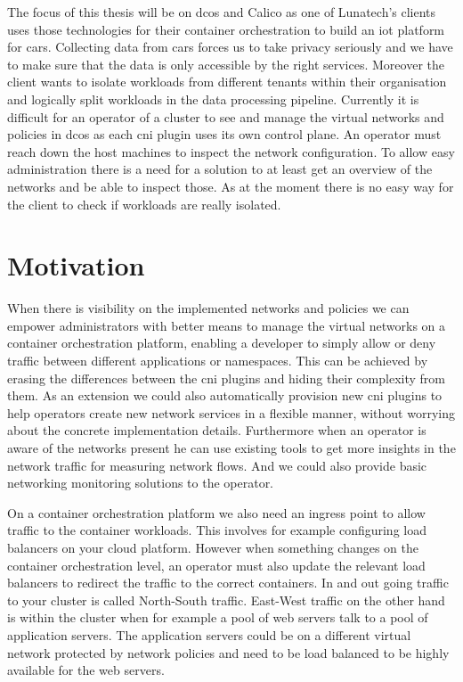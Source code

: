 The focus of this thesis will be on \gls{dcos} and Calico as one of Lunatech's clients uses those technologies for their container orchestration to build an \gls{iot} platform for cars. Collecting data from cars forces us to take privacy seriously and we have to make sure that the data is only accessible by the right services. Moreover the client wants to isolate workloads from different tenants within their organisation and logically split workloads in the data processing pipeline. Currently it is difficult for an operator of a cluster to see and manage the virtual networks and policies in \gls{dcos} as each \gls{cni} plugin uses its own control plane. An operator must reach down the host machines to inspect the network configuration. To allow easy administration there is a need for a solution to at least get an overview of the networks and be able to inspect those. As at the moment there is no easy way for the client to check if workloads are really isolated. 

\section{Motivation}
\label{motiviation}
When there is visibility on the implemented networks and policies we can empower administrators with better means to manage the virtual networks on a container orchestration platform, enabling a developer to simply allow or deny traffic between different applications or namespaces. This can be achieved by erasing the differences between the \gls{cni} plugins and hiding their complexity from them. As an extension we could also automatically provision new \gls{cni} plugins to help operators create new network services in a flexible manner, without worrying about the concrete implementation details. Furthermore when an operator is aware of the networks present he can use existing tools to get more insights in the network traffic for measuring network flows. And we could also provide basic networking monitoring solutions to the operator.

On a container orchestration platform we also need an ingress point to allow traffic to the container workloads. This involves for example configuring load balancers on your cloud platform. However when something changes on the container orchestration level, an operator must also update the relevant load balancers to redirect the traffic to the correct containers. In and out going traffic to your cluster is called North-South traffic. East-West traffic on the other hand is within the cluster when for example a pool of web servers talk to a pool of application servers. The application servers could be on a different virtual network protected by network policies and need to be load balanced to be highly available for the web servers.

